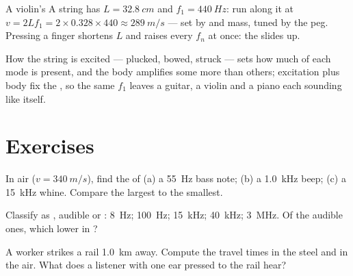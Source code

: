 \begin{example}\label{ex:g12:sound-acoustics:violin}
A violin's A string has $L = \qty{32.8}{cm}$ and 
$f_1 = \qty{440}{Hz}$:  run along it at
$v = 2Lf_1 = 2 \times 0.328 \times 440 \approx \qty{289}{m/s}$ ---
set by  and mass, tuned by the peg. Pressing a finger
shortens $L$ and raises every $f_n$ at once: the  slides up.
\end{example}

\begin{remark}\label{rem:g12:sound-acoustics:instruments}
How the string is excited --- plucked, bowed, struck --- sets how
much of each mode is present, and the body amplifies some 
more than others; excitation plus body fix the , so the same
$f_1$ leaves a guitar, a violin and a piano each sounding like itself.
\end{remark}

\section{Exercises}

\begin{exercise}[$\star$]\label{exo:g12:sound-acoustics:1}
In air ($v = \qty{340}{m/s}$), find the  of (a) a
\qty{55}{Hz} bass note; (b) a \qty{1.0}{kHz} beep; (c) a
\qty{15}{kHz} whine. Compare the largest to the smallest.
\end{exercise}

\begin{exercise}[$\star$]\label{exo:g12:sound-acoustics:2}
Classify as , audible  or : \qty{8}{Hz};
\qty{100}{Hz}; \qty{15}{kHz}; \qty{40}{kHz}; \qty{3}{MHz}. Of the
audible ones, which  lower in ?
\end{exercise}

\begin{exercise}[$\star$]\label{exo:g12:sound-acoustics:3}
A worker strikes a rail \qty{1.0}{km} away. Compute the travel times
in the steel and in the air. What does a listener with one ear
pressed to the rail hear?
\end{exercise}

